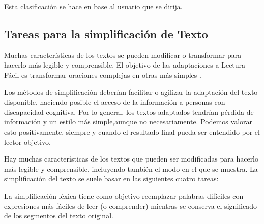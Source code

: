 Esta clasificación se hace en base al usuario que se dirija.



\subsection{Tareas para la simplificación de Texto}

Muchas características de los textos se pueden modificar o transformar para hacerlo más legible y comprensible. El objetivo de las adaptaciones a Lectura Fácil es transformar oraciones complejas en otras más simples \citep{HoracioSaggion}. 




Los métodos de simplificación deberían facilitar o agilizar la adaptación del texto disponible, haciendo posible el acceso de la información a personas con discapacidad cognitiva. Por lo general, los textos adaptados tendrían pérdida de información y un estilo más simple,aunque no necesariamente. Podemos valorar esto positivamente, siempre y cuando el resultado final pueda ser entendido por el lector objetivo. 


Hay muchas características de los textos que pueden ser modificadas para hacerlo más legible y comprensible, incluyendo también el modo en el que se muestra. La simplificación del texto se suele basar en las siguientes cuatro tareas:  


La simplificación léxica tiene como objetivo reemplazar palabras difíciles con expresiones más fáciles de leer (o comprender) mientras se conserva el significado de los segmentos del texto original.



